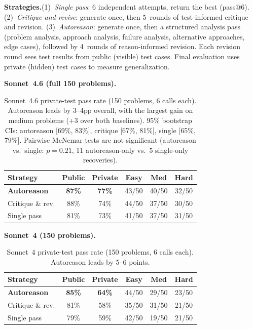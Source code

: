 \documentclass[11pt]{article}
\begin{document}
\textbf{Strategies.}\enspace (1)~\textit{Single pass}: 6 independent attempts, return the best (pass@6). (2)~\textit{Critique-and-revise}: generate once, then 5~rounds of test-informed critique and revision. (3)~\textit{Autoreason}: generate once, then a structured analysis pass (problem analysis, approach analysis, failure analysis, alternative approaches, edge cases), followed by 4~rounds of reason-informed revision. Each revision round sees test results from public (visible) test cases. Final evaluation uses private (hidden) test cases to measure generalization.

\textbf{Sonnet~4.6 (full 150 problems).}\enspace

\begin{table}[H]
\centering
\small
\begin{tabular}{@{}lccccc@{}}
\toprule
\textbf{Strategy} & \textbf{Public} & \textbf{Private} & \textbf{Easy} & \textbf{Med} & \textbf{Hard} \\
\midrule
\rowcolor{TableShade}
\textbf{Autoreason} & \textbf{87\%} & \textbf{77\%} & 43/50 & 40/50 & 32/50 \\
Critique \& rev. & 88\% & 74\% & 44/50 & 37/50 & 30/50 \\
\rowcolor{TableShade}
Single pass & 81\% & 73\% & 41/50 & 37/50 & 31/50 \\
\bottomrule
\end{tabular}
\caption{Sonnet~4.6 private-test pass rate (150 problems, 6 calls each). Autoreason leads by 3--4pp overall, with the largest gain on medium problems (+3 over both baselines). 95\% bootstrap CIs: autoreason [69\%, 83\%], critique [67\%, 81\%], single [65\%, 79\%]. Pairwise McNemar tests are not significant (autoreason vs.\ single: $p{=}0.21$, 11 autoreason-only vs.\ 5 single-only recoveries).}
\label{tab:code_s46}
\end{table}

\textbf{Sonnet~4 (150 problems).}\enspace

\begin{table}[H]
\centering
\small
\begin{tabular}{@{}lccccc@{}}
\toprule
\textbf{Strategy} & \textbf{Public} & \textbf{Private} & \textbf{Easy} & \textbf{Med} & \textbf{Hard} \\
\midrule
\rowcolor{TableShade}
\textbf{Autoreason} & \textbf{85\%} & \textbf{64\%} & 44/50 & 29/50 & 23/50 \\
Critique \& rev. & 81\% & 58\% & 35/50 & 31/50 & 21/50 \\
\rowcolor{TableShade}
Single pass & 79\% & 59\% & 42/50 & 19/50 & 21/50 \\
\bottomrule
\end{tabular}
\caption{Sonnet~4 private-test pass rate (150 problems, 6 calls each). Autoreason leads by 5--6 points.}
\label{tab:code}
\end{table}
\end{document}
